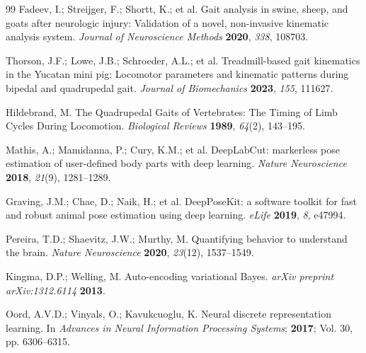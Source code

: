 \documentclass[computers,article,submit,pdftex,moreauthors]{Definitions/mdpi}
\begin{document}
\begin{thebibliography}{99}
 Fadeev, I.; Streijger, F.; Shortt, K.; et al. Gait analysis in swine, sheep, and goats after neurologic injury: Validation of a novel, non-invasive kinematic analysis system. \textit{Journal of Neuroscience Methods} \textbf{2020}, \textit{338}, 108703.

 Thorson, J.F.; Lowe, J.B.; Schroeder, A.L.; et al. Treadmill-based gait kinematics in the Yucatan mini pig: Locomotor parameters and kinematic patterns during bipedal and quadrupedal gait. \textit{Journal of Biomechanics} \textbf{2023}, \textit{155}, 111627.

 Hildebrand, M. The Quadrupedal Gaits of Vertebrates: The Timing of Limb Cycles During Locomotion. \textit{Biological Reviews} \textbf{1989}, \textit{64}(2), 143--195.

 Mathis, A.; Mamidanna, P.; Cury, K.M.; et al. DeepLabCut: markerless pose estimation of user-defined body parts with deep learning. \textit{Nature Neuroscience} \textbf{2018}, \textit{21}(9), 1281--1289.

 Graving, J.M.; Chae, D.; Naik, H.; et al. DeepPoseKit: a software toolkit for fast and robust animal pose estimation using deep learning. \textit{eLife} \textbf{2019}, \textit{8}, e47994.

 Pereira, T.D.; Shaevitz, J.W.; Murthy, M. Quantifying behavior to understand the brain. \textit{Nature Neuroscience} \textbf{2020}, \textit{23}(12), 1537--1549.

 Kingma, D.P.; Welling, M. Auto-encoding variational Bayes. \textit{arXiv preprint arXiv:1312.6114} \textbf{2013}.

 Oord, A.V.D.; Vinyals, O.; Kavukcuoglu, K. Neural discrete representation learning. In \textit{Advances in Neural Information Processing Systems}; \textbf{2017}; Vol. 30, pp. 6306--6315.

\end{thebibliography}
\end{document}
